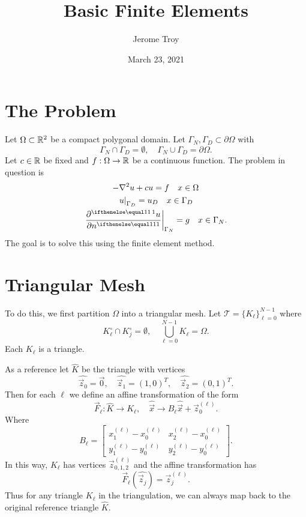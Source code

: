 \documentclass{article}
\title{Basic Finite Elements}
\author{Jerome Troy}
\date{March 23, 2021}
\begin{document}
  
\maketitle

\section{The Problem}

Let $\Omega \subset \mathbb{R}^2$ be a compact polygonal domain.  
Let $\Gamma_N, \Gamma_D \subset \partial \Omega$ with
\[
  \Gamma_N \cap \Gamma_D = \emptyset, \quad 
  \Gamma_N \cup \Gamma_D = \partial \Omega
.\] 
Let $c \in \mathbb{R}$ be fixed and 
$f : \Omega \to \mathbb{R}$ be a continuous function.
The problem in question is
\begin{gather}
  -\nabla^2 u + c u = f \quad x \in \Omega \\
  \restrict{u}{\Gamma_D} = u_D \quad x \in \Gamma_D \\
  \restrict{\pder{u}{n}}{\Gamma_N} = g \quad x \in \Gamma_N
.\end{gather}
The goal is to solve this using the finite element method.


\section{Triangular Mesh}

To do this, we first partition $\Omega$ into a triangular mesh.  
Let $\mathcal T = \{K_\ell\}_{\ell=0}^{N-1}$ where
\[
  K_\ell^\circ \cap K_j^\circ = \emptyset, \quad 
  \bigcup_{\ell=0}^{N-1} K_\ell = \Omega
.\] 
Each $K_\ell$ is a triangle.  

As a reference let 
$\hat K$ be the triangle with vertices
\[
		\hat{\vec z_0} = \vec 0, \quad 
		\hat{\vec z_1} = (1, 0)^T, \quad 
		\hat{\vec z_2} = (0, 1)^T
.\] 
Then for each $\ell$ we define an affine transformation 
of the form
\[
		\vec F_\ell : \hat K \to K_\ell, \quad 
		\hat{\vec x} \to B_\ell \hat{\vec x} + \vec z^{(\ell)}_0
.\] 
Where
\[
  B_\ell = 
  \begin{bmatrix}
		  x^{(\ell)}_1 - x^{(\ell)}_0 & x^{(\ell)}_2 - x^{(\ell)}_0 \\
		  y^{(\ell)}_1 - y^{(\ell)}_0 & y^{(\ell)}_2 - y^{(\ell)}_0
  \end{bmatrix}
.\] 
In this way, $K_\ell$ has vertices 
$\vec z^{(\ell)}_{0, 1, 2}$ and the affine transformation has
\[
		\vec F_\ell(\hat{\vec z_j}) = \vec z^{(\ell)}_j
.\] 
Thus for any triangle $K_\ell$ in the triangulation, we can
always map back to the original reference triangle $\hat K$.
\end{document}
